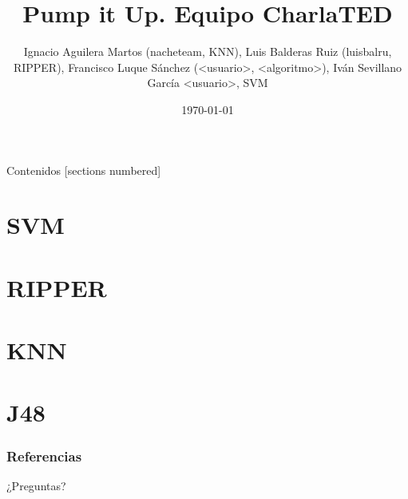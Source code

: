 \documentclass[10pt]{beamer}
\title{Pump it Up. Equipo CharlaTED}
\author{Ignacio Aguilera Martos (nacheteam, KNN), Luis Balderas Ruiz (luisbalru, RIPPER), Francisco Luque Sánchez (<usuario>, <algoritmo>), Iván Sevillano García <usuario>, SVM}
\date{\today}
\institute{Preprocesamiento y Clasificación}
\begin{document}
\maketitle

\begin{frame}[fragile]{Contenidos}
[sections numbered]
\tableofcontents[hideallsubsections]
\end{frame}

\section{SVM}


\section{RIPPER}


\section{KNN}


\section{J48}


\begin{frame}[allowframebreaks]
\frametitle{Referencias}


\end{frame}

\begin{frame}[standout]
\LARGE{¿Preguntas?}
\vspace{10px}

\end{frame}
\end{document}
